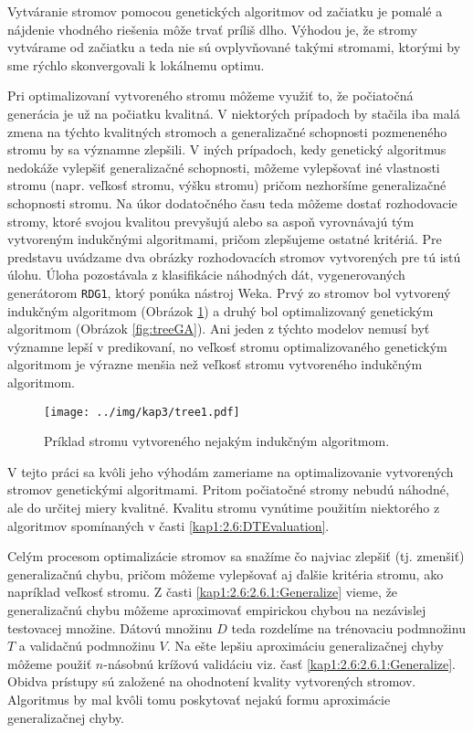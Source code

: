 Vytváranie stromov pomocou genetických algoritmov od začiatku je pomalé a nájdenie vhodného riešenia môže trvať príliš dlho. Výhodou je, že stromy vytvárame od začiatku a teda nie sú ovplyvňované takými stromami, ktorými by sme rýchlo skonvergovali k lokálnemu optimu. 

Pri optimalizovaní vytvoreného stromu môžeme využiť to, že počiatočná generácia je už na počiatku kvalitná. V niektorých prípadoch by stačila iba malá zmena na týchto kvalitných stromoch a generalizačné schopnosti pozmeneného stromu by sa významne zlepšili. V iných prípadoch, kedy genetický algoritmus nedokáže vylepšiť generalizačné schopnosti, môžeme vylepšovať iné vlastnosti stromu (napr. veľkosť stromu, výšku stromu) pričom nezhoršíme generalizačné schopnosti stromu. Na úkor dodatočného času teda môžeme dostať rozhodovacie stromy, ktoré svojou kvalitou prevyšujú alebo sa aspoň vyrovnávajú tým vytvoreným indukčnými algoritmami, pričom zlepšujeme ostatné kritériá. Pre predstavu uvádzame dva obrázky rozhodovacích stromov vytvorených pre tú istú úlohu. Úloha pozostávala z klasifikácie náhodných dát, vygenerovaných generátorom \verb|RDG1|, ktorý ponúka nástroj Weka. Prvý zo stromov bol vytvorený indukčným algoritmom (Obrázok \ref{fig:treeIA}) a druhý bol optimalizovaný genetickým algoritmom (Obrázok \ref{fig:treeGA}). Ani jeden z týchto modelov nemusí byť významne lepší v predikovaní, no veľkosť stromu optimalizovaného genetickým algoritmom je výrazne menšia než veľkosť stromu vytvoreného indukčným algoritmom.

\begin{figure}[h]
\centering
\centerline{\mbox{\texttt{[image: ../img/kap3/tree1.pdf]}}}
\caption{Príklad stromu vytvoreného nejakým indukčným algoritmom.}\label{fig:treeIA}
\end{figure}

V tejto práci sa kvôli jeho výhodám zameriame na optimalizovanie vytvorených stromov genetickými algoritmami. Pritom počiatočné stromy nebudú náhodné, ale do určitej miery kvalitné. Kvalitu stromu vynútime použitím niektorého z algoritmov spomínaných v časti \ref{kap1:2.6:DTEvaluation}. 

Celým procesom optimalizácie stromov sa snažíme čo najviac zlepšiť (tj. zmenšiť) generalizačnú chybu, pričom môžeme vylepšovať aj ďalšie kritéria stromu, ako napríklad veľkosť stromu. Z časti \ref{kap1:2.6:2.6.1:Generalize} vieme, že generalizačnú chybu môžeme aproximovať empirickou chybou na nezávislej testovacej množine. Dátovú množinu $D$ teda rozdelíme na trénovaciu podmnožinu $T$ a validačnú podmnožinu $V$. Na ešte lepšiu aproximáciu generalizačnej chyby môžeme použiť $n$-násobnú krížovú validáciu viz. časť \ref{kap1:2.6:2.6.1:Generalize}. Obidva prístupy sú založené na ohodnotení kvality vytvorených stromov. Algoritmus by mal kvôli tomu poskytovať nejakú formu aproximácie generalizačnej chyby.


